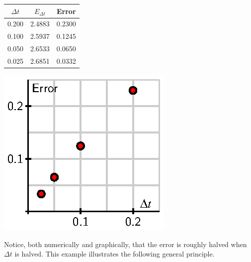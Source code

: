 \begin{center}
\begin{minipage}[c]{2.0in}
\begin{tabular}{|c|c|c|}
  \hline
  $\Delta t$ & $E_{\Delta t}$ & Error \\
  \hline
  0.200&2.4883&0.2300\\
  0.100&2.5937&0.1245\\
  0.050&2.6533&0.0650\\
  0.025&2.6851&0.0332\\
  \hline
\end{tabular}
\end{minipage}
\hspace*{0.25in}
\begin{minipage}[c]{2.0in}
\includegraphics{figures/7_3_error.eps}
\end{minipage}
\end{center}

Notice, both numerically and graphically, that the error is roughly halved when $\Delta t$ is halved.
This example illustrates the following general principle.

\vspace*{5pt}
\nin {}
\vspace*{1pt}

\newpage

